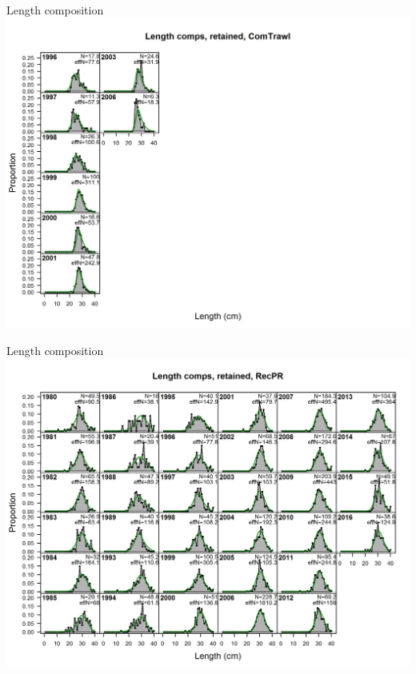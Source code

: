 \documentclass[ignorenonframetext,compress]{beamer}
\begin{document}
\begin{frame}{Length composition}\includegraphics{./r4ss/plots_mod1/comp_lenfit_flt3mkt2.png}\end{frame}

\begin{frame}{Length composition}\includegraphics{./r4ss/plots_mod1/comp_lenfit_flt4mkt2.png}\end{frame}
\end{document}
